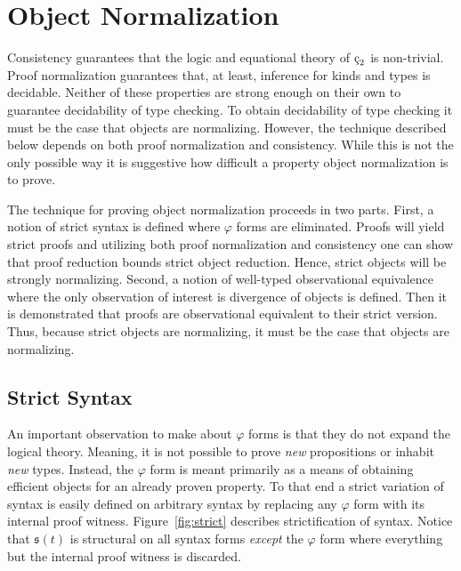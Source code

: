 \chapter{Object Normalization}

Consistency guarantees that the logic and equational theory of $\ced$ is non-trivial.
Proof normalization guarantees that, at least, inference for kinds and types is decidable.
Neither of these properties are strong enough on their own to guarantee decidability of type checking.
To obtain decidability of type checking it must be the case that objects are normalizing.
However, the technique described below depends on both proof normalization and consistency.
While this is not the only possible way it is suggestive how difficult a property object normalization is to prove.

The technique for proving object normalization proceeds in two parts.
First, a notion of strict syntax is defined where $\varphi$ forms are eliminated.
Proofs will yield strict proofs and utilizing both proof normalization and consistency one can show that proof reduction bounds strict object reduction.
Hence, strict objects will be strongly normalizing.
Second, a notion of well-typed observational equivalence where the only observation of interest is divergence of objects is defined.
Then it is demonstrated that proofs are observational equivalent to their strict version.
Thus, because strict objects are normalizing, it must be the case that objects are normalizing.

\section{Strict Syntax}

An important observation to make about $\varphi$ forms is that they do not expand the logical theory.
Meaning, it is not possible to prove \textit{new} propositions or inhabit \textit{new} types.
Instead, the $\varphi$ form is meant primarily as a means of obtaining efficient objects for an already proven property.
To that end a strict variation of syntax is easily defined on arbitrary syntax by replacing any $\varphi$ form with its internal proof witness.
Figure~\ref{fig:strict} describes strictification of syntax.
Notice that $\mathfrak{s}(t)$ is structural on all syntax forms \textit{except} the $\varphi$ form where everything but the internal proof witness is discarded.



